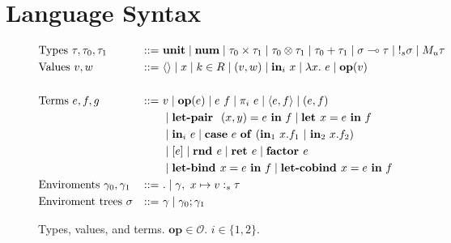 \section{Language Syntax}

\begin{figure}[tbp]
  \begin{alignat*}{3}
         &\text{Types } \tau, \tau_0, \tau_1 &::=~ &\mathbf{unit}
         \mid \textbf{num}
         \mid \tau_0 \times \tau_1
         \mid \tau_0 \otimes \tau_1
         \mid \tau_0 + \tau_1
         \mid \sigma \multimap \tau
         \mid {{!_{s}} \sigma}
         \mid {M_u \tau}
         \\
         &\text{Values } v, w \ &::=~ &\langle \rangle
         \mid x
         \mid k \in R
         \mid (v, w)
         \mid \textbf{in}_i \ x
         \mid \lambda x.~e
         \mid \mathbf{op}(v) \\
         \\
         &\text{Terms } e, f, g &::=~ &v
         \mid \mathbf{op}(e)
         \mid e~f
         \mid {\pi}_i\ e
         \mid \langle e,f \rangle 
         \mid (e, f) \\
         & & & \mid \textbf{let-pair } \ (x,y) = e \ \textbf{in} \ f
         \mid \textbf{let } x  = e \ \textbf{in} \ f \\
         & & & \mid \textbf{in}_i \ e
         \mid 
          \mathbf{case} \ e \ \mathbf{of} \ (\textbf{in}_1 \ x.f_1 \ | \ \textbf{in}_2 \ x.f_2) \\
         & & &
         \mid [e]
         \mid \textbf{rnd } e
         \mid {\textbf{ret }e} 
         \mid \textbf{factor } e \\
         & & & 
         \mid {\textbf{let-bind }x = e \ \textbf{in}\ f}
         \mid \textbf{let-cobind } x = e \ \textbf{in} \ f
         \\
         &\text{Enviroments } \gamma_0, \gamma_1 &::=~ &.
         \mid \gamma, \ x \mapsto v :_s \tau \\
         &\text{Enviroment trees } \sigma &::=~ & \gamma
         \mid \gamma_0; \gamma_1
  \end{alignat*}
  \caption{
    Types, values, and terms. 
    $\mathbf{op} \in \mathcal{O}$.
    $i \in \{1, 2\}$. 
  }
  \label{fig:syntax}
\end{figure}


